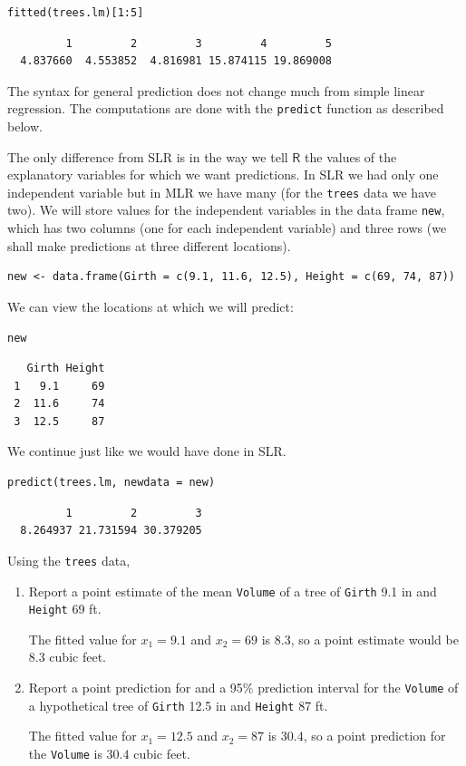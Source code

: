 \documentclass[captions=tableheading]{scrbook}
\begin{document}
\begin{verbatim}
fitted(trees.lm)[1:5]
\end{verbatim}

\begin{verbatim}
         1         2         3         4         5 
  4.837660  4.553852  4.816981 15.874115 19.869008
\end{verbatim}

The syntax for general prediction does not change much from simple linear regression. The computations are done with the \texttt{predict} function as described below. 

The only difference from SLR is in the way we tell \(\mathsf{R}\) the values of the explanatory variables for which we want predictions. In SLR we had only one independent variable but in MLR we have many (for the \texttt{trees} data we have two). We will store values for the independent variables in the data frame \texttt{new}, which has two columns (one for each independent variable) and three rows (we shall make predictions at three different locations).


\begin{verbatim}
new <- data.frame(Girth = c(9.1, 11.6, 12.5), Height = c(69, 74, 87))
\end{verbatim}

We can view the locations at which we will predict:


\begin{verbatim}
new
\end{verbatim}

\begin{verbatim}
   Girth Height
 1   9.1     69
 2  11.6     74
 3  12.5     87
\end{verbatim}

We continue just like we would have done in SLR.


\begin{verbatim}
predict(trees.lm, newdata = new)
\end{verbatim}

\begin{verbatim}
         1         2         3 
  8.264937 21.731594 30.379205
\end{verbatim}



\begin{example}
Using the \texttt{trees} data,
\begin{enumerate}
\item Report a point estimate of the mean \texttt{Volume} of a tree of \texttt{Girth} 9.1 in and \texttt{Height} 69 ft.

   The fitted value for \(x_{1}=9.1\) and \(x_{2}=69\) is \(  8.3 \), so a point estimate would be \(  8.3 \) cubic feet.
\item Report a point prediction for and a 95\% prediction interval for the \texttt{Volume} of a hypothetical tree of \texttt{Girth} 12.5 in and \texttt{Height} 87 ft.

   The fitted value for \(x_{1} = 12.5\) and \(x_{2} = 87\) is \(  30.4 \), so a point prediction for the \texttt{Volume} is \(  30.4 \) cubic feet.
\end{enumerate}
\end{example}
\end{document}
